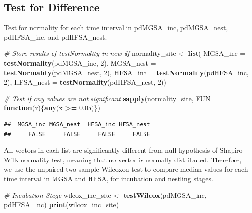 \documentclass[]{article}
\newenvironment{Shaded}{\begin{snugshade}}{\end{snugshade}}
\newcommand{\CommentTok}[1]{\textcolor[rgb]{0.56,0.35,0.01}{\textit{#1}}}
\newcommand{\ControlFlowTok}[1]{\textcolor[rgb]{0.13,0.29,0.53}{\textbf{#1}}}
\newcommand{\DataTypeTok}[1]{\textcolor[rgb]{0.13,0.29,0.53}{#1}}
\newcommand{\DecValTok}[1]{\textcolor[rgb]{0.00,0.00,0.81}{#1}}
\newcommand{\FloatTok}[1]{\textcolor[rgb]{0.00,0.00,0.81}{#1}}
\newcommand{\KeywordTok}[1]{\textcolor[rgb]{0.13,0.29,0.53}{\textbf{#1}}}
\newcommand{\NormalTok}[1]{#1}
\newcommand{\OperatorTok}[1]{\textcolor[rgb]{0.81,0.36,0.00}{\textbf{#1}}}
\newcommand{\StringTok}[1]{\textcolor[rgb]{0.31,0.60,0.02}{#1}}
\begin{document}
\hypertarget{test-for-difference-1}{%
\subsection{Test for Difference}\label{test-for-difference-1}}

Test for normality for each time interval in pdMGSA\_inc, pdMGSA\_nest,
pdHFSA\_inc, and pdHFSA\_nest.

\begin{Shaded}
\begin{Highlighting}[]
\CommentTok{# Store results of testNormality in new df}
\NormalTok{normality_site <-}\StringTok{ }\KeywordTok{list}\NormalTok{(}
  \DataTypeTok{MGSA_inc =} \KeywordTok{testNormality}\NormalTok{(pdMGSA_inc, }\DecValTok{2}\NormalTok{), }
  \DataTypeTok{MGSA_nest =} \KeywordTok{testNormality}\NormalTok{(pdMGSA_nest, }\DecValTok{2}\NormalTok{), }
  \DataTypeTok{HFSA_inc =} \KeywordTok{testNormality}\NormalTok{(pdHFSA_inc, }\DecValTok{2}\NormalTok{),}
  \DataTypeTok{HFSA_nest =} \KeywordTok{testNormality}\NormalTok{(pdHFSA_nest, }\DecValTok{2}\NormalTok{))}

\CommentTok{# Test if any values are not significant}
\KeywordTok{sapply}\NormalTok{(normality_site, }\DataTypeTok{FUN =} \ControlFlowTok{function}\NormalTok{(x)\{}\KeywordTok{any}\NormalTok{(x }\OperatorTok{>=}\StringTok{ }\FloatTok{0.05}\NormalTok{)\})}
\end{Highlighting}
\end{Shaded}

\begin{verbatim}
##  MGSA_inc MGSA_nest  HFSA_inc HFSA_nest 
##     FALSE     FALSE     FALSE     FALSE
\end{verbatim}

All vectors in each list are significantly different from null
hypothesis of Shapiro-Wilk normality test, meaning that no vector is
normally distributed. Therefore, we use the unpaired two-sample Wilcoxon
test to compare median values for each time interval in MGSA and HFSA,
for incubation and nestling stages.

\begin{Shaded}
\begin{Highlighting}[]
\CommentTok{# Incubation Stage}
\NormalTok{wilcox_inc_site <-}\StringTok{ }\KeywordTok{testWilcox}\NormalTok{(pdMGSA_inc, pdHFSA_inc)}
\KeywordTok{print}\NormalTok{(wilcox_inc_site)}
\end{Highlighting}
\end{Shaded}
\end{document}
